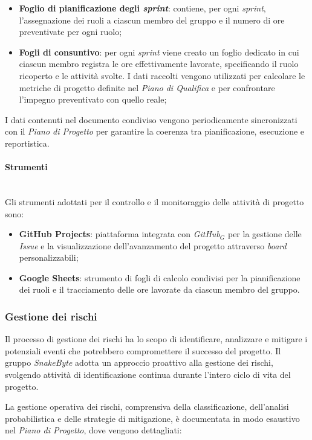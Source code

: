 \documentclass[10pt, letterpaper]{article}
\newcommand{\trisubsection}[1]{\paragraph{#1}\mbox{}\\}
\begin{document}
\begin{itemize}
    \item \textbf{Foglio di pianificazione degli \textit{sprint}}: contiene, per ogni \textit{sprint}, l'assegnazione dei ruoli a ciascun membro del gruppo e il numero di ore preventivate per ogni ruolo;

    \item \textbf{Fogli di consuntivo}: per ogni \textit{sprint} viene creato un foglio dedicato in cui ciascun membro registra le ore effettivamente lavorate, specificando il ruolo ricoperto e le attività svolte. I dati raccolti vengono utilizzati per calcolare le metriche di progetto definite nel \textit{Piano di Qualifica} e per confrontare l'impegno preventivato con quello reale;

\end{itemize}

I dati contenuti nel documento condiviso vengono periodicamente sincronizzati con il \textit{Piano di Progetto} per garantire la coerenza tra pianificazione, esecuzione e reportistica.

\trisubsection{Strumenti}
Gli strumenti adottati per il controllo e il monitoraggio delle attività di progetto sono:

\begin{itemize}
    \item \textbf{GitHub Projects}: piattaforma integrata con \textit{GitHub$_{G}$} per la gestione delle \textit{Issue} e la visualizzazione dell'avanzamento del progetto attraverso \textit{board} personalizzabili;
    \item \textbf{Google Sheets}: strumento di fogli di calcolo condivisi per la pianificazione dei ruoli e il tracciamento delle ore lavorate da ciascun membro del gruppo.
\end{itemize}

\subsubsection{Gestione dei rischi}
Il processo di gestione dei rischi ha lo scopo di identificare, analizzare e mitigare i potenziali eventi che potrebbero compromettere il successo del progetto. Il gruppo \textit{SnakeByte} adotta un approccio proattivo alla gestione dei rischi, svolgendo attività di identificazione continua durante l'intero ciclo di vita del progetto.

La gestione operativa dei rischi, comprensiva della classificazione, dell'analisi probabilistica e delle strategie di mitigazione, è documentata in modo esaustivo nel \textit{Piano di Progetto}, dove vengono dettagliati:
\end{document}
